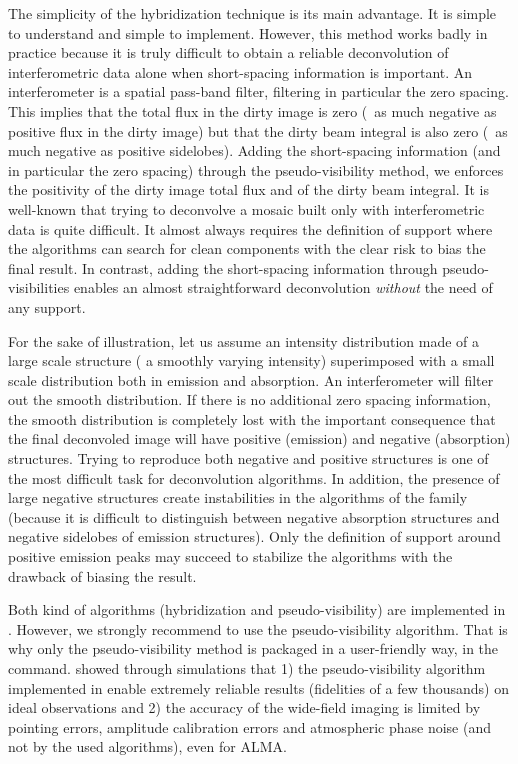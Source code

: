 The simplicity of the hybridization technique is its main advantage. It is
simple to understand and simple to implement. However, this method works
badly in practice because it is truly difficult to obtain a
reliable deconvolution of interferometric data alone when short-spacing
information is important. An interferometer is a spatial pass-band
filter, filtering in particular the zero spacing. This implies that the total flux in the
dirty image is zero (\ie\ as much negative as positive flux in the dirty
image) but that the dirty beam integral is also zero (\ie\ as much negative
as positive sidelobes). Adding the short-spacing information (and in
particular the zero spacing) through the pseudo-visibility method, we
enforces the positivity of the dirty image total flux and of the dirty beam
integral. It is well-known that trying to deconvolve a mosaic built only
with interferometric data is quite difficult. It almost always requires the
definition of support where the \clean{} algorithms can search for clean
components with the clear risk to bias the final result. In contrast,
adding the short-spacing information through pseudo-visibilities enables an
almost straightforward \clean{} deconvolution \emph{without} the need of
any support.

For the sake of illustration, let us assume an intensity distribution 
made of a large scale structure (\eg{} a smoothly varying intensity) 
superimposed with a small scale distribution both in emission and 
absorption. An interferometer will filter out the smooth 
distribution. If there is no additional zero spacing 
information, the smooth distribution is completely lost with 
the important consequence that the final deconvoled image will have 
positive (emission) and negative (absorption) structures. Trying to 
reproduce both negative and positive structures is one of the most 
difficult task for deconvolution algorithms. In addition, the 
presence of large negative structures create instabilities in the 
algorithms of the \clean{} family (because it is difficult to 
distinguish between negative absorption structures and negative 
sidelobes of emission structures). Only the definition of support 
around positive emission peaks may succeed to stabilize the \clean{} 
algorithms with the drawback of biasing the result.

Both kind of algorithms (hybridization and pseudo-visibility) are
implemented in \gildas{}. However, we strongly recommend to use the
pseudo-visibility algorithm. That is why only the pseudo-visibility method
is packaged in a user-friendly way, in the  command.
\citet{pety01b,pety01a,pety01c} showed through
simulations that 1) the pseudo-visibility algorithm implemented in
\gildas{} enable extremely reliable results (fidelities of a few thousands)
on ideal observations and 2) the accuracy of the wide-field imaging is
limited by pointing errors, amplitude calibration errors and atmospheric
phase noise (and not by the used algorithms), even for ALMA.

